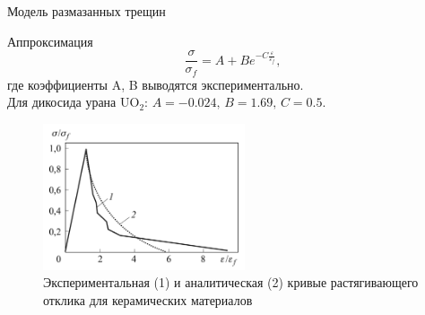\documentclass{beamer}
\begin{document}
	\begin{frame}{Модель размазанных трещин}
		\begin{block}{Аппроксимация}
			\begin{equation}
				\dfrac{\sigma}{\sigma_f} = A + B e^{-C \tfrac{\varepsilon}{\varepsilon_f}},	
			\end{equation}
			где коэффициенты A, B выводятся экспериментально.\\ Для дикосида урана UO$_2$:
			$
			A = -0.024,\, B = 1.69, \, C = 0.5.  
			$
		\end{block}
		\begin{figure}[h]
			\centering
			\includegraphics[width=0.53\textwidth]{ceramic}
				\captionsetup{labelformat=empty}
			\caption{\small{Экспериментальная (1) и аналитическая (2) кривые растягивающего отклика для керамических материалов}}

		\end{figure}
	\end{frame}
\end{document}

